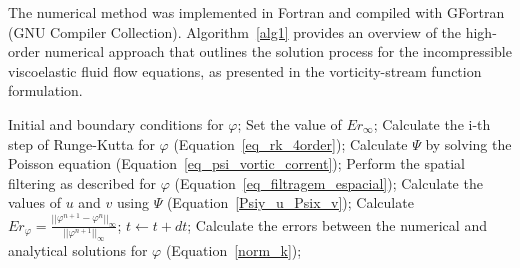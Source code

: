 \documentclass[preprint, 12pt]{elsarticle}
\begin{document}
The numerical method was implemented in Fortran and compiled with GFortran (GNU Compiler Collection). Algorithm~\ref{alg1} provides an overview of the high-order numerical approach that outlines the solution process for the incompressible viscoelastic fluid flow equations, as presented in the vorticity-stream function formulation.

\begin{algorithm}
\caption{High-order numerical method for incompressible viscoelastic flow equations.}
\label{alg1}
\begin{algorithmic}[1]
  \State Initial and boundary conditions for $\varphi$;
  \State Set the value of $Er_{\infty}$; 
       \State Calculate the i-th step of Runge-Kutta for $\varphi$ (Equation~\ref{eq_rk_4order});
       \State Calculate $\Psi$ by solving the Poisson equation (Equation~\ref{eq_psi_vortic_corrent});
       \State Perform the spatial filtering as described for $\varphi$ (Equation~\ref{eq_filtragem_espacial});
       \State Calculate the values of $u$ and $v$ using $\Psi$ (Equation~\ref{Psiy_u_Psix_v});
    \EndFor
    \State Calculate $Er_{\varphi} = \frac{||\varphi^{n+1} - \varphi^{n}||_{\infty}}{||\varphi^{n+1}||_{\infty}}$; 
    \State $t \gets t + dt $; 
  \EndWhile
  \State Calculate the errors between the numerical and analytical solutions for $\varphi$ (Equation~\eqref{norm_k});
\EndFunction
\end{algorithmic}
\end{algorithm}
\normalsize
\end{document}
